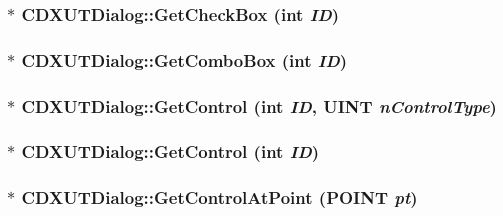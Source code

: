 \label{class_c_d_x_u_t_dialog_a72a80373de83c0a368e04e9d1266494c}
\hypertarget{class_c_d_x_u_t_dialog_a69bff29d7b3dda3665fe23acff9b075d}{
\subsubsection[{GetCheckBox}]{$\ast$ CDXUTDialog::GetCheckBox ({\bf int} {\em ID})}}
\label{class_c_d_x_u_t_dialog_a69bff29d7b3dda3665fe23acff9b075d}
\hypertarget{class_c_d_x_u_t_dialog_a2f11b9478861af81e40bebb3718a4ee3}{
\subsubsection[{GetComboBox}]{$\ast$ CDXUTDialog::GetComboBox ({\bf int} {\em ID})}}
\label{class_c_d_x_u_t_dialog_a2f11b9478861af81e40bebb3718a4ee3}
\hypertarget{class_c_d_x_u_t_dialog_a7490e9cfec52ad62442c30c4f862b83a}{
\subsubsection[{GetControl}]{ $\ast$ CDXUTDialog::GetControl ({\bf int} {\em ID}, \/  UINT {\em nControlType})}}
\label{class_c_d_x_u_t_dialog_a7490e9cfec52ad62442c30c4f862b83a}
\hypertarget{class_c_d_x_u_t_dialog_ad65e23ac0ba4e4b5af0128f6518f09ae}{
\subsubsection[{GetControl}]{ $\ast$ CDXUTDialog::GetControl ({\bf int} {\em ID})}}
\label{class_c_d_x_u_t_dialog_ad65e23ac0ba4e4b5af0128f6518f09ae}
\hypertarget{class_c_d_x_u_t_dialog_a8d1c613d40be521ed5307446e33196e1}{
\subsubsection[{GetControlAtPoint}]{ $\ast$ CDXUTDialog::GetControlAtPoint (POINT {\em pt})}}
